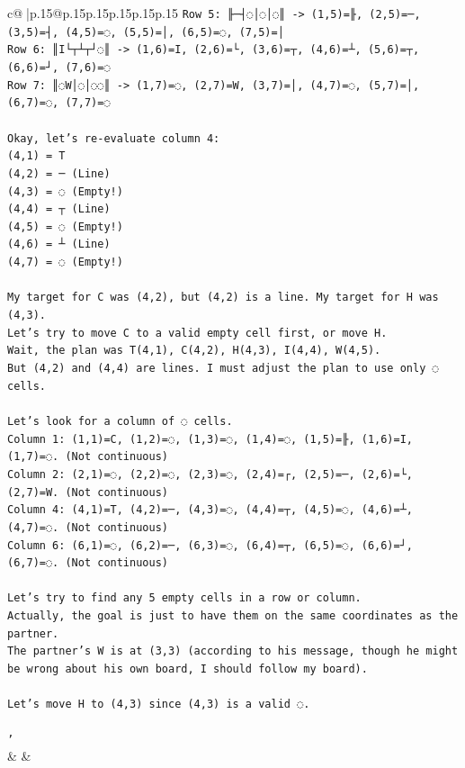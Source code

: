 \documentclass{article}
\begin{document}
{\begin{supertabular}{c@{$\;$}|p{.15\linewidth}@{}p{.15\linewidth}p{.15\linewidth}p{.15\linewidth}p{.15\linewidth}p{.15\linewidth}}
{{{\texttt{Row 5: ╟─┤◌│◌│◌║ {-}> (1,5)=╟, (2,5)=─, (3,5)=┤, (4,5)=◌, (5,5)=│, (6,5)=◌, (7,5)=│} \\
\texttt{Row 6: ║I└┬┴┬┘◌║ {-}> (1,6)=I, (2,6)=└, (3,6)=┬, (4,6)=┴, (5,6)=┬, (6,6)=┘, (7,6)=◌} \\
\texttt{Row 7: ║◌W│◌│◌◌║ {-}> (1,7)=◌, (2,7)=W, (3,7)=│, (4,7)=◌, (5,7)=│, (6,7)=◌, (7,7)=◌} \\
\\ 
\texttt{Okay, let's re{-}evaluate column 4:} \\
\texttt{(4,1) = T} \\
\texttt{(4,2) = ─ (Line)} \\
\texttt{(4,3) = ◌ (Empty!)} \\
\texttt{(4,4) = ┬ (Line)} \\
\texttt{(4,5) = ◌ (Empty!)} \\
\texttt{(4,6) = ┴ (Line)} \\
\texttt{(4,7) = ◌ (Empty!)} \\
\\ 
\texttt{My target for C was (4,2), but (4,2) is a line. My target for H was (4,3).} \\
\texttt{Let's try to move C to a valid empty cell first, or move H.} \\
\texttt{Wait, the plan was T(4,1), C(4,2), H(4,3), I(4,4), W(4,5).} \\
\texttt{But (4,2) and (4,4) are lines. I must adjust the plan to use only ◌ cells.} \\
\\ 
\texttt{Let's look for a column of ◌ cells.} \\
\texttt{Column 1: (1,1)=C, (1,2)=◌, (1,3)=◌, (1,4)=◌, (1,5)=╟, (1,6)=I, (1,7)=◌. (Not continuous)} \\
\texttt{Column 2: (2,1)=◌, (2,2)=◌, (2,3)=◌, (2,4)=┌, (2,5)=─, (2,6)=└, (2,7)=W. (Not continuous)} \\
\texttt{Column 4: (4,1)=T, (4,2)=─, (4,3)=◌, (4,4)=┬, (4,5)=◌, (4,6)=┴, (4,7)=◌. (Not continuous)} \\
\texttt{Column 6: (6,1)=◌, (6,2)=─, (6,3)=◌, (6,4)=┬, (6,5)=◌, (6,6)=┘, (6,7)=◌. (Not continuous)} \\
\\ 
\texttt{Let's try to find any 5 empty cells in a row or column.} \\
\texttt{Actually, the goal is just to have them on the same coordinates as the partner.} \\
\texttt{The partner's W is at (3,3) (according to his message, though he might be wrong about his own board, I should follow my board).} \\
\\ 
\texttt{Let's move H to (4,3) since (4,3) is a valid ◌.} \\
\\ 
\texttt{'} \\
            }
        }
    }
    & & \\ \\


\end{supertabular}}
\end{document}
